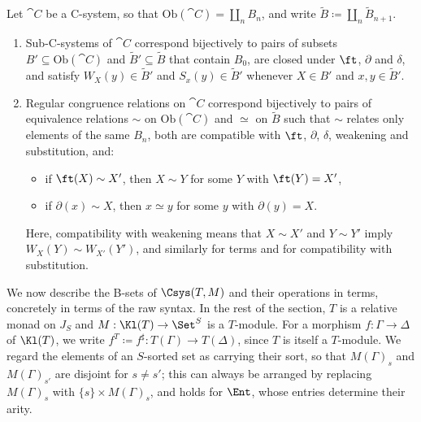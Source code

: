 \begin{proposition}\label{prop:b-characterisation}
    Let $\cat{C}$ be a C-system, so that $\mathrm{Ob}(\cat{C}) = \coprod_n B_n$, and write $\widetilde{B} \coloneqq \coprod_n \widetilde{B}_{n+1}$.
    \begin{enumerate}
        \item Sub-C-systems of $\cat{C}$ correspond bijectively to pairs of subsets $B' \subseteq \mathrm{Ob}(\cat{C})$ and $\widetilde{B}' \subseteq \widetilde{B}$ that contain $B_0$, are closed under $\ft$, $\partial$ and $\delta$, and satisfy $W_X(y) \in \widetilde{B}'$ and $S_x(y) \in \widetilde{B}'$ whenever $X \in B'$ and $x, y \in \widetilde{B}'$.
        \item Regular congruence relations on $\cat{C}$ correspond bijectively to pairs of equivalence relations $\sim$ on $\mathrm{Ob}(\cat{C})$ and $\simeq$ on $\widetilde{B}$ such that $\sim$ relates only elements of the same $B_n$, both are compatible with $\ft$, $\partial$, $\delta$, weakening and substitution, and:
        \begin{itemize}
            \item if $\ft(X) \sim X'$, then $X \sim Y$ for some $Y$ with $\ft(Y) = X'$,
            \item if $\partial(x) \sim X$, then $x \simeq y$ for some $y$ with $\partial(y) = X$.
        \end{itemize}
        Here, compatibility with weakening means that $X \sim X'$ and $Y \sim Y'$ imply $W_X(Y) \sim W_{X'}(Y')$, and similarly for terms and for compatibility with substitution.
    \end{enumerate}
\end{proposition}

We now describe the B-sets of $\Csys(T, M)$ and their operations in terms, concretely in terms of the raw syntax. In the rest of the section, $T$ is a relative monad on $J_S$ and $M : \Kl(T) \to \Set^S$ is a $T$-module. For a morphism $f : \Gamma \to \Delta$ of $\Kl(T)$, we write $f^T \coloneqq f^\sharp : T(\Gamma) \to T(\Delta)$, since $T$ is itself a $T$-module. We regard the elements of an $S$-sorted set as carrying their sort, so that $M(\Gamma)_s$ and $M(\Gamma)_{s'}$ are disjoint for $s \neq s'$; this can always be arranged by replacing $M(\Gamma)_s$ with $\{s\} \times M(\Gamma)_s$, and holds for $\Ent$, whose entries determine their arity.

